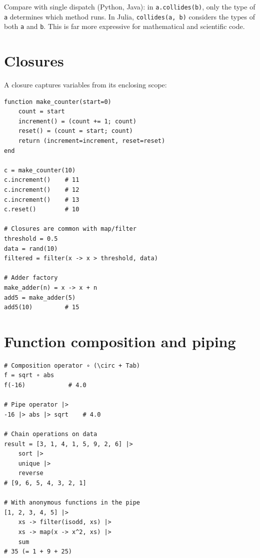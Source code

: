 \begin{juliatip}
Compare with single dispatch (Python, Java): in \texttt{a.collides(b)}, only the type of \texttt{a} determines which method runs. In Julia, \texttt{collides(a, b)} considers the types of both \texttt{a} and \texttt{b}. This is far more expressive for mathematical and scientific code.
\end{juliatip}

\section{Closures}

A closure captures variables from its enclosing scope:

\begin{verbatim}
function make_counter(start=0)
    count = start
    increment() = (count += 1; count)
    reset() = (count = start; count)
    return (increment=increment, reset=reset)
end

c = make_counter(10)
c.increment()    # 11
c.increment()    # 12
c.increment()    # 13
c.reset()        # 10

# Closures are common with map/filter
threshold = 0.5
data = rand(10)
filtered = filter(x -> x > threshold, data)

# Adder factory
make_adder(n) = x -> x + n
add5 = make_adder(5)
add5(10)         # 15
\end{verbatim}

\section{Function composition and piping}

\begin{verbatim}
# Composition operator ∘ (\circ + Tab)
f = sqrt ∘ abs
f(-16)            # 4.0

# Pipe operator |>
-16 |> abs |> sqrt    # 4.0

# Chain operations on data
result = [3, 1, 4, 1, 5, 9, 2, 6] |>
    sort |>
    unique |>
    reverse
# [9, 6, 5, 4, 3, 2, 1]

# With anonymous functions in the pipe
[1, 2, 3, 4, 5] |>
    xs -> filter(isodd, xs) |>
    xs -> map(x -> x^2, xs) |>
    sum
# 35 (= 1 + 9 + 25)
\end{verbatim}

